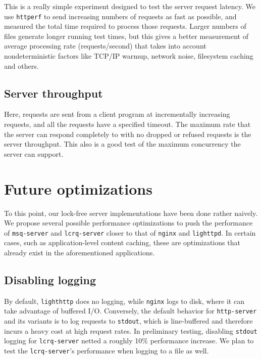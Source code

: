 \documentclass[twoside,10pt]{article}
\begin{document}
\begin{multicols}{2}
This is a really simple experiment designed to test the server request
latency. We use \verb+httperf+ to send increasing numbers of requests
as fast as possible, and measured the total time required to process
those requests. Larger numbers of files generate longer running test
times, but this gives a better measurement of average processing rate
(requests/second) that takes into account nondeterministic factors
like TCP/IP warmup, network noise, filesystem caching and others.

\subsection{Server throughput}

Here, requests are sent from a client program at incrementally
increasing requests, and all the requests have a specified
timeout. The maximum rate that the server can respond completely to
with no dropped or refused requests is the server throughput. This
also is a good test of the maximum concurrency the server can support.

\section{Future optimizations}

To this point, our lock-free server implementations have been done
rather naively. We propose several possible performance optimizations
to push the performance of \verb+msq-server+ and \verb+lcrq-server+
closer to that of \verb+nginx+ and \verb+lighttpd+. In certain cases,
such as application-level content caching, these are optimizations
that already exist in the aforementioned applications.

\subsection{Disabling logging}
By default, \verb+lighthttp+ does no logging, while \verb+nginx+ logs
to disk, where it can take advantage of buffered I/O. Conversely, the
default behavior for \verb+http-server+ and its variants is to log
requests to \verb+stdout+, which is line-buffered and therefore incurs
a heavy cost at high request rates. In preliminary testing, disabling
\verb+stdout+ logging for \verb+lcrq-server+ netted a roughly 10\%
performance increase. We plan to test the \verb+lcrq-server+'s
performance when logging to a file as well.


\end{multicols}
\end{document}
